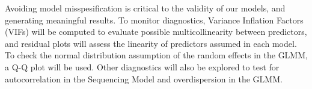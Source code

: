 \documentclass[11pt]{article}
\begin{document}
Avoiding model misspesification is critical to the validity of our models, and generating meaningful results. To monitor diagnostics, Variance Inflation Factors (VIFs) will be computed to evaluate possible multicollinearity between predictors, and residual plots will assess the linearity of predictors assumed in each model. To check the normal distribution assumption of the random effects in the GLMM, a Q-Q plot will be used. Other diagnostics will also be explored to test for autocorrelation in the Sequencing Model and overdispersion in the GLMM.


\newpage
\nocite{*}


\end{document}
